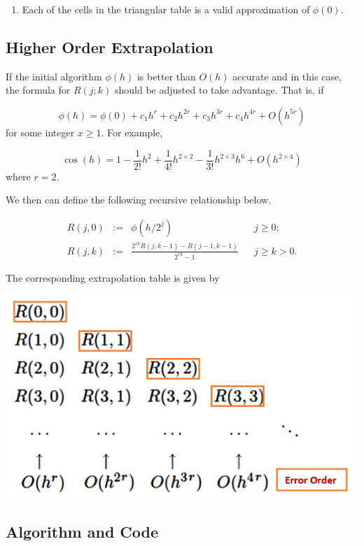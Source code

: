 \documentclass[
]{book}
\providecommand{\tightlist}{%
  \setlength{\itemsep}{0pt}\setlength{\parskip}{0pt}}
\begin{document}
\begin{enumerate}
\def\labelenumi{\arabic{enumi}.}
\setcounter{enumi}{2}
\tightlist
\item
  Each of the cells in the triangular table is a valid approximation of \(\phi(0)\).
\end{enumerate}

\hfill\break

\hypertarget{higher-order-extrapolation}{%
\subsection{Higher Order Extrapolation}\label{higher-order-extrapolation}}

If the initial algorithm \(\phi(h)\) is better than \(O(h)\) accurate and in this case, the formula for \(R(j; k)\) should be adjusted to take advantage. That is, if

\[
\phi(h) = \phi(0) + c_1h^r + c_2h^{2r} + c_3h^{3r} + c_4h^{4r} + O(h^{5r})
\]
for some integer \(x \ge 1\). For example,

\[
\cos(h) = 1 - \frac{1}{2!}h^2 + \frac{1}{4!}h^{2\times2} - \frac{1}{3!}h^{2\times3}h^6 + O(h^{2\times 4})
\]
where \(r = 2\).

We then can define the following recursive relationship below.

\[
\begin{array}{lclcl}
 R(j, 0) & := & \phi(h/2^j) &  & j \ge 0;  \\ 
 R(j, k) & := & \frac{2^{rk}R(j, k-1)-R(j-1, k-1)}{2^{rk}-1}  &   & j \ge k > 0.  
\end{array}
\]

The corresponding extrapolation table is given by

\begin{center}\includegraphics[width=0.45\linewidth]{img13/w13-RichardsonHigherOrder} \end{center}

\hfill\break

\hypertarget{algorithm-and-code}{%
\subsection{Algorithm and Code}\label{algorithm-and-code}}
\end{document}
